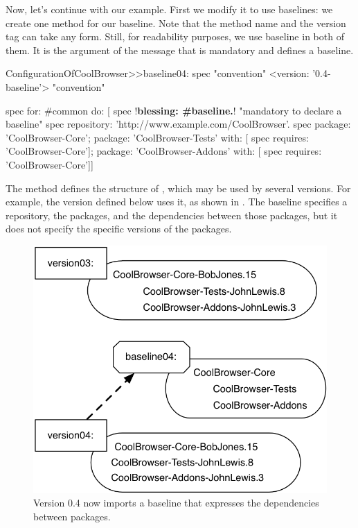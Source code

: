 \documentclass[a4paper,10pt,twoside]{book}
\begin{document}
Now, let's continue with our example. First we modify it to use baselines: we create one method for our baseline. 
Note that the method name and the version tag can take any form. Still, for readability purposes, we use baseline in both of them.
It is the argument of the  message that is mandatory and defines a baseline. 
\needspace{17ex}
\begin{code}{}
ConfigurationOfCoolBrowser>>baseline04: spec 				"convention"
       <version: '0.4-baseline'> 					              		"convention"
       
       spec for: #common do: [
              spec !\textbf{blessing: \#baseline.}!    "mandatory to declare a baseline"
              spec repository: 'http://www.example.com/CoolBrowser'.
              spec 
                  package: 'CoolBrowser-Core';
                  package: 'CoolBrowser-Tests' with: [ spec requires: 'CoolBrowser-Core'];
                  package: 'CoolBrowser-Addons' with: [ spec requires: 'CoolBrowser-Core']]
\end{code}

The method  defines the structure of ,
which may be used by several versions. For example, the version  defined below uses it, as shown in .  The baseline specifies a repository, the packages, and the  dependencies between those packages, but it does not specify the specific versions of the packages.  

\begin{figure}
\begin{center}
\includegraphics[width=0.6\linewidth]{version04}
\caption{Version 0.4 now imports a baseline that expresses the dependencies between packages.\label{fig:version04}}
\end{center}
\end{figure} 
\end{document}
